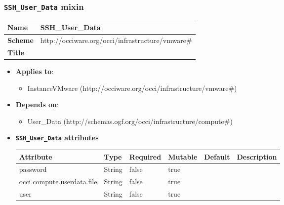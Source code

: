 \subsubsection{\texttt{SSH\_User_Data} mixin}
\begin{center}
\begin{tabular}{|l|l|}
  \hline
  \textbf{Name} & SSH\_User_Data \\
  \hline  
  \textbf{Scheme} & http://occiware.org/occi/infrastructure/vmware\# \\
  \hline
  \textbf{Title} &  \\
  \hline
\end{tabular}
\end{center}
\begin{itemize}
\item \textbf{Applies to}:
\begin{itemize}
	\item InstanceVMware (http://occiware.org/occi/infrastructure/vmware\#)
\end{itemize}
\end{itemize} 
\begin{itemize}
\item \textbf{Depends on}:
\begin{itemize}
	\item User\_Data (http://schemas.ogf.org/occi/infrastructure/compute\#)
\end{itemize}
\end{itemize}

\begin{itemize}
\item \textbf{\texttt{SSH\_User_Data} attributes}

\begin{tabularx}{\textwidth}{|l|l|p{1.4cm}|p{1.3cm}|l|X|}
  \hline
  \textbf{Attribute} & \textbf{Type} & \textbf{Required} & \textbf{Mutable} & \textbf{Default} & \textbf{Description} \\
  \hline  
  password & String & false & true &  &  \\
  \hline
  occi.compute.userdata.file & String & false & true &  &  \\
  \hline
  user & String & false & true &  &  \\
  \hline
\end{tabularx}
\end{itemize}


 
